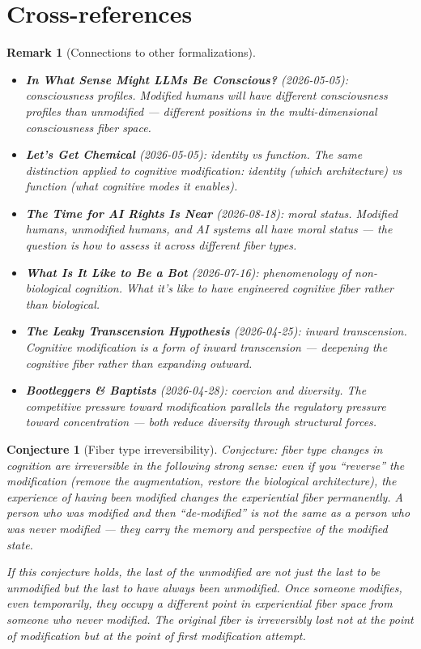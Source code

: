 \documentclass[11pt,a4paper]{article}
\newtheorem{conjecture}[definition]{Conjecture}
\newtheorem{remark}[definition]{Remark}
\begin{document}
\section{Cross-references}

\begin{remark}[Connections to other formalizations]
\begin{itemize}
\item \textbf{In What Sense Might LLMs Be Conscious?} (2026-05-05):
  consciousness profiles. Modified humans will have different
  consciousness profiles than unmodified --- different positions
  in the multi-dimensional consciousness fiber space.
\item \textbf{Let's Get Chemical} (2026-05-05): identity vs function.
  The same distinction applied to cognitive modification: identity
  (which architecture) vs function (what cognitive modes it enables).
\item \textbf{The Time for AI Rights Is Near} (2026-08-18): moral
  status. Modified humans, unmodified humans, and AI systems all
  have moral status --- the question is how to assess it across
  different fiber types.
\item \textbf{What Is It Like to Be a Bot} (2026-07-16): phenomenology
  of non-biological cognition. What it's like to have engineered
  cognitive fiber rather than biological.
\item \textbf{The Leaky Transcension Hypothesis} (2026-04-25):
  inward transcension. Cognitive modification is a form of inward
  transcension --- deepening the cognitive fiber rather than expanding
  outward.
\item \textbf{Bootleggers \& Baptists} (2026-04-28): coercion and
  diversity. The competitive pressure toward modification parallels
  the regulatory pressure toward concentration --- both reduce
  diversity through structural forces.
\end{itemize}
\end{remark}

\begin{conjecture}[Fiber type irreversibility]
Conjecture: fiber type changes in cognition are irreversible in the
following strong sense: even if you ``reverse'' the modification
(remove the augmentation, restore the biological architecture), the
\emph{experience} of having been modified changes the experiential
fiber permanently. A person who was modified and then ``de-modified''
is not the same as a person who was never modified --- they carry
the memory and perspective of the modified state.

If this conjecture holds, the last of the unmodified are not just the
last to \emph{be} unmodified but the last to \emph{have always been}
unmodified. Once someone modifies, even temporarily, they occupy a
different point in experiential fiber space from someone who never
modified. The original fiber is irreversibly lost not at the point
of modification but at the point of \emph{first modification attempt}.
\end{conjecture}
\end{document}
